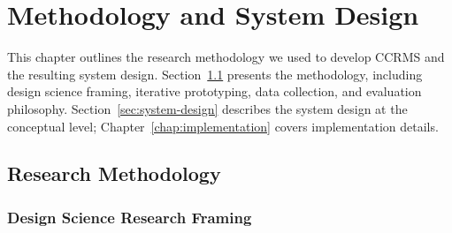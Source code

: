 
\chapter{Methodology and System Design}\label{chap:methodology}

This chapter outlines the research methodology we used to develop CCRMS and the resulting system design. Section~\ref{sec:research-methodology} presents the methodology, including design science framing, iterative prototyping, data collection, and evaluation philosophy. Section~\ref{sec:system-design} describes the system design at the conceptual level; Chapter~\ref{chap:implementation} covers implementation details.

\section{Research Methodology}\label{sec:research-methodology}

\subsection{Design Science Research Framing}\label{subsec:dsr-framing}

